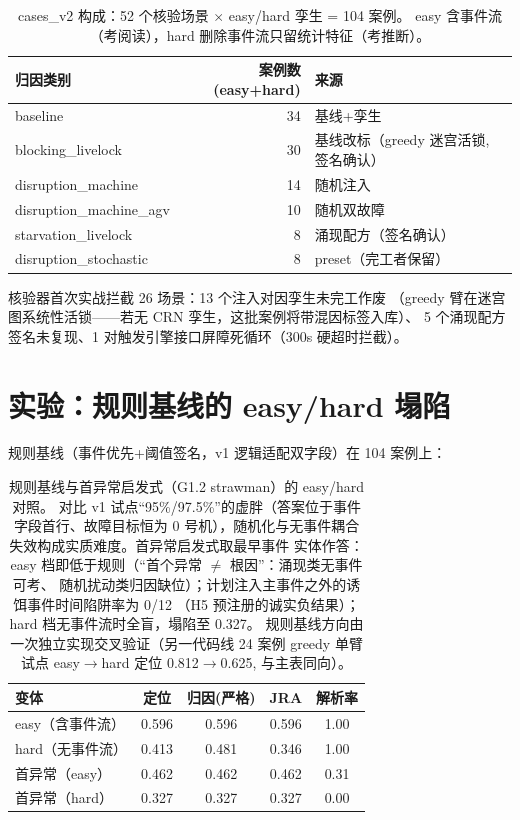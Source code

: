 \documentclass[UTF8,12pt,a4paper]{ctexart}
\begin{document}
\begin{table}[h]\centering\small
\begin{tabular}{lrl}
\toprule
归因类别 & 案例数(easy+hard) & 来源\\
\midrule
baseline & 34 & 基线+孪生\\
blocking\_livelock & 30 & 基线改标（greedy 迷宫活锁, 签名确认）\\
disruption\_machine & 14 & 随机注入\\
disruption\_machine\_agv & 10 & 随机双故障\\
starvation\_livelock & 8 & 涌现配方（签名确认）\\
disruption\_stochastic & 8 & preset（完工者保留）\\
\bottomrule
\end{tabular}
\caption{cases\_v2 构成：52 个核验场景 $\times$ easy/hard 孪生 = 104 案例。
easy 含事件流（考阅读），hard 删除事件流只留统计特征（考推断）。}\label{tab:data}
\end{table}

核验器首次实战拦截 26 场景：13 个注入对因孪生未完工作废
（greedy 臂在迷宫图系统性活锁——若无 CRN 孪生，这批案例将带混因标签入库）、
5 个涌现配方签名未复现、1 对触发引擎接口屏障死循环（300s 硬超时拦截）。

\section{实验：规则基线的 easy/hard 塌陷}\label{sec:exp}

规则基线（事件优先+阈值签名，v1 逻辑适配双字段）在 104 案例上：

\begin{table}[h]\centering\small
\begin{tabular}{lcccc}
\toprule
变体 & 定位 & 归因(严格) & JRA & 解析率\\
\midrule
easy（含事件流） & 0.596 & 0.596 & 0.596 & 1.00\\
hard（无事件流） & 0.413 & 0.481 & 0.346 & 1.00\\
首异常（easy） & 0.462 & 0.462 & 0.462 & 0.31\\
首异常（hard） & 0.327 & 0.327 & 0.327 & 0.00\\
\bottomrule
\end{tabular}
\caption{规则基线与首异常启发式（G1.2 strawman）的 easy/hard 对照。
对比 v1 试点``95\%/97.5\%''的虚胖（答案位于事件字段首行、故障目标恒为
0 号机），随机化与无事件耦合失效构成实质难度。首异常启发式取最早事件
实体作答：easy 档即低于规则（``首个异常 $\neq$ 根因''：涌现类无事件可考、
随机扰动类归因缺位）；计划注入主事件之外的诱饵事件时间陷阱率为 0/12
（H5 预注册的诚实负结果）；hard 档无事件流时全盲，塌陷至 0.327。
规则基线方向由一次独立实现交叉验证（另一代码线 24 案例 greedy 单臂
试点 easy$\to$hard 定位 0.812$\to$0.625, 与主表同向）。}\label{tab:rule}
\end{table}
\end{document}
